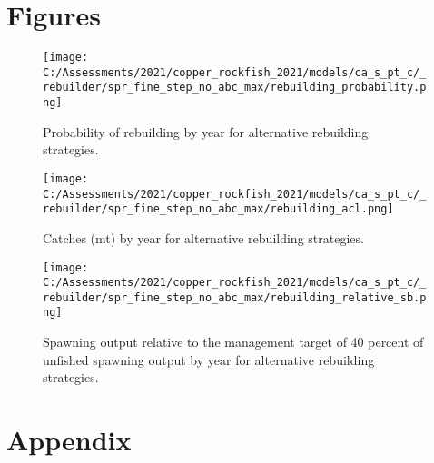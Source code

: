 \documentclass[11pt,
  english,
  a4paper,
]{article}
\begin{document}
\clearpage


\hypertarget{figures}{%
\section{Figures}\label{figures}}

\leavevmode\tagmcend\tagstructend


\begin{figure}
\centering
\texttt{[image: C:/Assessments/2021/copper\_rockfish\_2021/models/ca\_s\_pt\_c/\_rebuilder/spr\_fine\_step\_no\_abc\_max/rebuilding\_probability.png]}
\caption{Probability of rebuilding by year for alternative rebuilding strategies.\label{fig:prob-fig}}
\end{figure}

\tagmcend\tagstructend


\begin{figure}
\centering
\texttt{[image: C:/Assessments/2021/copper\_rockfish\_2021/models/ca\_s\_pt\_c/\_rebuilder/spr\_fine\_step\_no\_abc\_max/rebuilding\_acl.png]}
\caption{Catches (mt) by year for alternative rebuilding strategies.\label{fig:acl-fig}}
\end{figure}

\tagmcend\tagstructend


\begin{figure}
\centering
\texttt{[image: C:/Assessments/2021/copper\_rockfish\_2021/models/ca\_s\_pt\_c/\_rebuilder/spr\_fine\_step\_no\_abc\_max/rebuilding\_relative\_sb.png]}
\caption{Spawning output relative to the management target of 40 percent of unfished spawning output by year for alternative rebuilding strategies.\label{fig:rel-ssb-fig}}
\end{figure}

\tagmcend\tagstructend

\clearpage


\hypertarget{appendix}{%
\section{Appendix}\label{appendix}}
\end{document}
